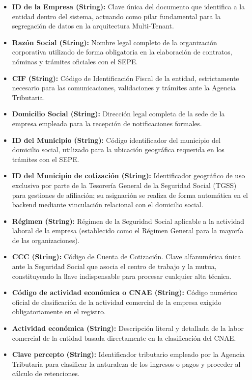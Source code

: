\begin{itemize}
    \item \textbf{ID de la Empresa (String):} Clave única del documento que identifica a la entidad dentro del sistema, actuando como pilar fundamental para la segregación de datos en la arquitectura Multi-Tenant.
    \item \textbf{Razón Social (String):} Nombre legal completo de la organización corporativa utilizado de forma obligatoria en la elaboración de contratos, nóminas y trámites oficiales con el SEPE.
    \item \textbf{CIF (String):} Código de Identificación Fiscal de la entidad, estrictamente necesario para las comunicaciones, validaciones y trámites ante la Agencia Tributaria.
    \item \textbf{Domicilio Social (String):} Dirección legal completa de la sede de la empresa empleada para la recepción de notificaciones formales.
    \item \textbf{ID del Municipio (String):} Código identificador del municipio del domicilio social, utilizado para la ubicación geográfica requerida en los trámites con el SEPE.
    \item \textbf{ID del Municipio de cotización (String):} Identificador geográfico de uso exclusivo por parte de la Tesorería General de la Seguridad Social (TGSS) para gestiones de afiliación; su asignación se realiza de forma automática en el backend mediante vinculación relacional con el domicilio social.
    \item \textbf{Régimen (String):} Régimen de la Seguridad Social aplicable a la actividad laboral de la empresa (establecido como el Régimen General para la mayoría de las organizaciones).
    \item \textbf{CCC (String):} Código de Cuenta de Cotización. Clave alfanumérica única ante la Seguridad Social que asocia el centro de trabajo y la mutua, constituyendo la llave indispensable para procesar cualquier alta técnica.
    \item \textbf{Código de actividad económica o CNAE (String):} Código numérico oficial de clasificación de la actividad comercial de la empresa exigido obligatoriamente en el registro.
    \item \textbf{Actividad económica (String):} Descripción literal y detallada de la labor comercial de la entidad basada directamente en la clasificación del CNAE.
    \item \textbf{Clave percepto (String):} Identificador tributario empleado por la Agencia Tributaria para clasificar la naturaleza de los ingresos o pagos y proceder al cálculo de retenciones.

\end{itemize}
